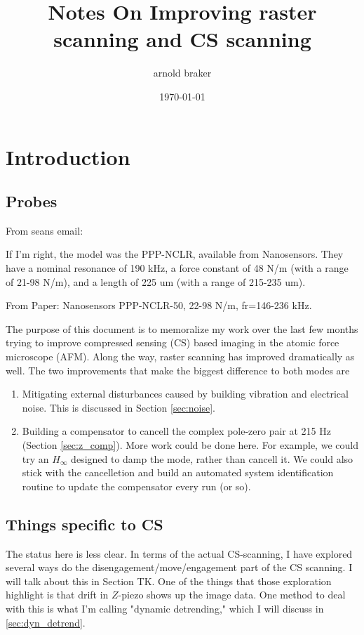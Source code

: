\documentclass[11pt]{article}
\author{arnold braker}
\date{\today}
\title{Notes On Improving raster scanning and CS scanning}
\begin{document}
\maketitle

\section{Introduction}

\subsection{Probes}

From seans email:

If I’m right, the model was the PPP-NCLR, available from Nanosensors. They have a nominal resonance of 190 kHz, a force constant of 48 N/m (with a range of 21-98 N/m), and a length of 225 um (with a range of 215-235 um).

From Paper: Nanosensors PPP-NCLR-50, 22-98 N/m, fr=146-236 kHz.


\label{sec:orgdb0dcd6}
The purpose of this document is to memoralize my work over the last few months trying to improve compressed sensing (CS) based imaging in the atomic force microscope (AFM). Along the way, raster scanning has improved dramatically as well. The two improvements that make the biggest difference to both modes are 

\begin{enumerate}
\item Mitigating external disturbances caused by building vibration and electrical noise. This is discussed in Section \ref{sec:noise}.
\item Building a compensator to cancell the complex pole-zero pair at 215 Hz (Section \ref{sec:z_comp}). More work could be done here. For example, we could try an \(H_{\infty}\) designed to damp the mode, rather than cancell it. We could also stick with the cancelletion and build an automated system identification routine to update the compensator every run (or so).
\end{enumerate}

\subsection{Things specific to CS}
\label{sec:org1bbe619}
The status here is less clear. In terms of the actual CS-scanning, I have explored several ways do the disengagement/move/engagement part of the CS scanning. I will talk about this in Section TK. One of the things that those exploration highlight is that drift in \(Z\)-piezo shows up the image data. One method to deal with this is what I'm calling "dynamic detrending," which I will discuss in \ref{sec:dyn_detrend}. 
\end{document}
